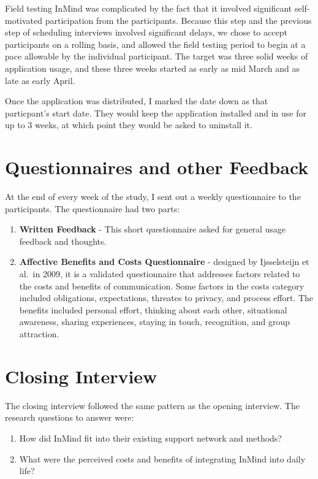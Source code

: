   Field testing InMind was complicated by the fact that it involved
  significant self-motivated participation from the participants.
  Because this step and the previous step of scheduling interviews
  involved significant delays,
  we chose to accept participants on a rolling basis,
  and allowed the field testing period to begin at a pace allowable
  by the individual participant.
  The target was three solid weeks of application usage,
  and these three weeks started as early as mid March
  and as late as early April.

  Once the application was distributed,
  I marked the date down as that particpant's start date.
  They would keep the application installed and in use for up to 3 weeks,
  at which point they would be asked to uninstall it.

\section{Questionnaires and other Feedback}
  At the end of every week of the study,
  I sent out a weekly questionnaire to the participants.
  The questionnaire had two parts:
  \begin{enumerate}
  \item \textbf{Written Feedback} -
  This short questionnaire asked for
  general usage feedback and thoughts.

  \item \textbf{Affective Benefits and Costs Questionnaire} -
  designed by Ijsselsteijn et al.\ in 2009,
  it is a validated questionnaire that
  addresses factors related to the costs and benefits of communication.
  Some factors in the costs category included obligations,
  expectations, threates to privacy, and process effort.
  The benefits included personal effort,
  thinking about each other,
  situational awareness,
  sharing experiences,
  staying in touch,
  recognition,
  and group attraction.
  \end{enumerate}

\section{Closing Interview}
  The closing interview followed the same pattern as the opening interview.
  The research questions to answer were:
  \begin{enumerate}
  \item How did InMind fit into their existing support network and methods?
  \item What were the perceived costs and benefits of integrating InMind
  into daily life?
  \end{enumerate}

